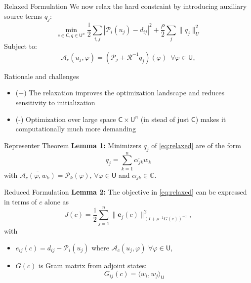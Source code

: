 \documentclass{beamer}
\newcommand{\sU}{\mathsf{U}}
\newcommand{\sC}{\mathsf{C}}
\newcommand{\mA}{\mathcal{A}}
\newcommand{\mP}{\mathcal{P}}
\newcommand{\mR}{\mathcal{R}}
\begin{document}
\begin{frame}{Relaxed Formulation}
We now relax the hard constraint by introducing auxiliary source terms $q_j$:
\begin{equation}
  \label{eq:relaxed}
\min_{c\in\sC, q\in\sU^n} \frac{1}{2} \sum_{i,j} |\mP_i(u_j) - d_{ij}|^2 + \frac{\rho}{2} \sum_j \|q_j\|_U^2
\end{equation}
Subject to:
\begin{equation*}
\mA_c(u_j, \varphi) = (\mP_j + \mR^{-1}q_j)(\varphi) \,\,\, \forall \varphi \in \sU,
\end{equation*}
\end{frame}

\begin{frame}{Rationale and challenges}
\begin{itemize}
  \item (+) The relaxation improves the optimization landscape and reduces sensitivity to initialization
  \item (-) Optimization over large space $\sC \times \sU^n$ (in stead of just $\sC$) makes it computationally much more demanding
\end{itemize}
\end{frame}

\begin{frame}{Representer Theorem}
\textbf{Lemma 1:} Minimizers $q_j$ of \eqref{eq:relaxed} are of the form
\begin{equation*}
q_j = \sum_{k=1}^n \overline{\alpha_{jk}} w_k
\end{equation*}
with $\overline{\mA_c(\varphi, w_k)} = \mP_k(\varphi),\, \forall \varphi\in\sU$ and $\alpha_{jk}\in\mathbb{C}$.
\end{frame}

\begin{frame}{Reduced Formulation}
\textbf{Lemma 2:}
The objective in \eqref{eq:relaxed} can be expressed in terms of $c$ alone as 
\begin{equation*}
J(c) = \frac{1}{2} \sum_{j=1}^n \|\mathbf{e}_j(c)\|_{(I + \rho^{-1} G(c))^{-1}}^2,
\end{equation*}
with
\begin{itemize}
  \item $e_{ij}(c) = d_{ij}-\mP_i(u_j)$ where $\mA_c(u_j,\varphi)\,\, \forall \varphi\in\sU$,
  \item $G(c)$ is Gram matrix from adjoint states:
\begin{equation*}
G_{ij}(c) = \langle w_i, w_j \rangle_\sU
\end{equation*}
\end{itemize}
\end{frame}
\end{document}
